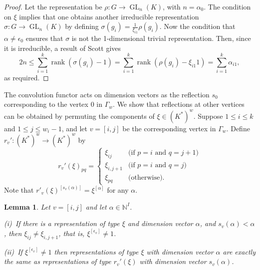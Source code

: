 \documentclass{amsart}
\theoremstyle{plain}
\newtheorem{lem}[thm]{Lemma}
\theoremstyle{definition}
\theoremstyle{remark}
\newcommand{\N}{\mathbb{N}}
\DeclareMathOperator{\GL}{GL}
\DeclareMathOperator{\rank}{rank}
\begin{document}
\begin{proof}
Let the representation be $\rho:G\to\GL_n(K)$, with $n=\alpha_0$.
The condition on $\xi$ implies that one obtains another
irreducible representation $\sigma:G\to\GL_n(K)$ by defining
$\sigma(g_i)=\frac{1}{\xi_{i1}} \rho(g_i)$.
Now the condition that $\alpha\neq\epsilon_0$ ensures that
$\sigma$ is not the 1-dimensional trivial representation.
Then, since it is irreducible, a result of Scott \cite[Theorem 1]{Scott} gives
\[
2n \le \sum_{i=1}^k \rank(\sigma(g_i)-1) = \sum_{i=1}^k \rank(\rho(g_i)-\xi_{i1} 1) = \sum_{i=1}^k \alpha_{i1},
\]
as required.
\end{proof}



The convolution functor acts on dimension vectors as the reflection $s_0$
corresponding to the vertex 0 in $\Gamma_w$. We show that reflections at other vertices
can be obtained by permuting the components of $\xi\in (K^*)^w$.
Suppose $1\le i\le k$ and $1\le j\le w_i-1$, and let $v=[i,j]$ be the
corresponding vertex in $\Gamma_w$. Define
$r_v':(K^*)^w \to (K^*)^w$ by
\[
r_v'(\xi)_{pq} = \begin{cases}
\xi_{ij} & \text{(if $p=i$ and $q=j+1$)} \\
\xi_{i,j+1} & \text{(if $p=i$ and $q=j$)} \\
\xi_{pq} & \text{(otherwise).}
\end{cases}
\]
Note that $r'_v(\xi)^{[s_v(\alpha)]}=\xi^{[\alpha]}$ for any $\alpha$.


\begin{lem}\label{l:armreflrep}
Let $v=[i,j]$ and let $\alpha\in\N^I$.

\textup{\hphantom{i}(i)}~If there is a representation of type $\xi$ and dimension vector $\alpha$, and
$s_v(\alpha) < \alpha$, then $\xi_{ij}\neq \xi_{i,j+1}$, that is, $\xi^{[\epsilon_v]}\neq 1$.

\textup{(ii)}~If $\xi^{[\epsilon_v]}\neq 1$ then representations of type $\xi$ with dimension vector $\alpha$
are exactly the same as representations of type $r_v'(\xi)$ with dimension vector $s_v(\alpha)$.
\end{lem}
\end{document}

